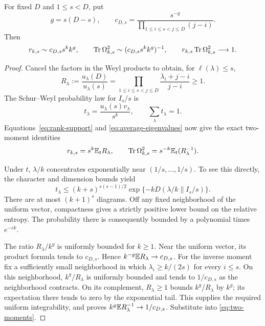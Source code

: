 \begin{theorem}\label{thm:flat-average}
For fixed $D$ and $1\le s<D$, put
\begin{equation}\label{eq:rank-constant}
 g=s(D-s),\qquad
 c_{D,s}=\frac{s^{-g}}{\displaystyle\prod_{1\le i\le s<j\le D}(j-i)}.
\end{equation}
Then
\begin{equation}\label{eq:support-asymptotic}
 r_{k,s}\sim c_{D,s}s^kk^g,\qquad
 \operatorname{Tr}\Omega_{k,s}^2\sim(c_{D,s}s^kk^g)^{-1},\qquad
 r_{k,s}\operatorname{Tr}\Omega_{k,s}^2\longrightarrow1.
\end{equation}
\end{theorem}
\begin{proof}
Cancel the factors in the Weyl products to obtain, for $\ell(\lambda)\le s$,
\begin{equation}\label{eq:weyl-ratio}
 R_\lambda:=\frac{u_\lambda(D)}{u_\lambda(s)}
 =\prod_{1\le i\le s<j\le D}\frac{\lambda_i+j-i}{j-i}\ge1.
\end{equation}
The Schur--Weyl probability law for $I_s/s$ is
\[
 t_\lambda=\frac{u_\lambda(s)v_\lambda}{s^k},\qquad\sum_\lambda t_\lambda=1.
\]
Equations~\eqref{eq:rank-support} and \eqref{eq:average-eigenvalues} now give the exact two-moment identities
\begin{equation}\label{eq:two-moments}
 r_{k,s}=s^k\mathbb E_tR_\lambda,\qquad
 \operatorname{Tr}\Omega_{k,s}^2=s^{-k}\mathbb E_t(R_\lambda^{-1}).
\end{equation}

Under $t$, $\lambda/k$ concentrates exponentially near $(1/s,\ldots,1/s)$. To see this directly, the character and dimension bounds yield
\[
 t_\lambda\le(k+s)^{s(s-1)/2}
 \exp\{-kD(\lambda/k\|I_s/s)\}.
\]
There are at most $(k+1)^s$ diagrams. Off any fixed neighborhood of the uniform vector, compactness gives a strictly positive lower bound on the relative entropy. The probability there is consequently bounded by a polynomial times $e^{-ck}$.

The ratio $R_\lambda/k^g$ is uniformly bounded for $k\ge1$. Near the uniform vector, its product formula tends to $c_{D,s}$. Hence $k^{-g}\mathbb E R_\lambda\to c_{D,s}$. For the inverse moment fix a sufficiently small neighborhood in which $\lambda_i\ge k/(2s)$ for every $i\le s$. On this neighborhood, $k^g/R_\lambda$ is uniformly bounded and tends to $1/c_{D,s}$ as the neighborhood contracts. On its complement, $R_\lambda\ge1$ bounds $k^g/R_\lambda$ by $k^g$; its expectation there tends to zero by the exponential tail. This supplies the required uniform integrability, and proves $k^g\mathbb E R_\lambda^{-1}\to1/c_{D,s}$. Substitute into \eqref{eq:two-moments}.
\end{proof}

